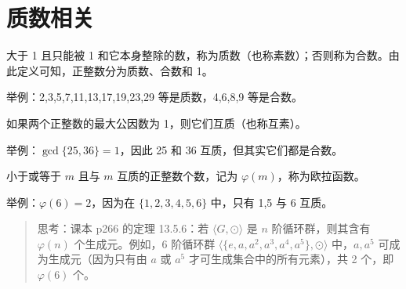 \documentclass[UTF8]{ctexart}
\newcommand\Concept[1]{\colorbox{cyan!10!white}{\textcolor{cyan!40!black}{#1}}}
\newcommand\Notes[1]{\textcolor{yellow!50!black}{\small #1}}
\newcommand\Example[1]{\textcolor{cyan!70!black}{\small #1}}
\newcommand\relation[2]{\langle #1,#2 \rangle}
\newcommand\pos[1]{\hspace{0pt} \marginpar{\footnotesize\ttfamily\textcolor{yellow!50!black}{\hfill #1}}}
\begin{document}
\section{质数相关}
\begin{description}[itemsep=0pt, parsep=0pt]
    \item[\Concept{质数与合数}] \pos{p186} 大于 1 且只能被 1 和它本身整除的数，称为质数（也称\Concept{素数}）；否则称为合数。由此定义可知，正整数分为质数、合数和 1。

    \Example{举例：2,3,5,7,11,13,17,19,23,29 等是质数，4,6,8,9 等是合数。}

    \item[\Concept{互质}] \pos{p188} 如果两个正整数的最大公因数为 1，则它们互质（也称\Concept{互素}）。

    \Example{举例：$\gcd\{25,36\}=1$，因此 25 和 36 互质，但其实它们都是合数。}

    \item[\Concept{欧拉函数$\varphi(m)$}] \pos{p196} 小于或等于 $m$ 且与 $m$ 互质的正整数个数，记为 $\varphi(m)$，称为欧拉函数。

    \Example{举例：$\varphi(6)=2$，因为在 $\{1,2,3,4,5,6\}$ 中，只有 1,5 与 6 互质。}
\end{description}

\newpage
{}
\BgThispage
\begin{quote}
    \Notes{思考：课本 p266 的定理 13.5.6：若 $\relation{G}{\odot}$ 是 $n$ 阶循环群，则其含有 $\varphi(n)$ 个生成元。例如，$6$ 阶循环群 $\relation{\{e,a,a^2,a^3,a^4,a^5\}}{\odot}$ 中，$a,a^5$ 可成为生成元（因为只有由 $a$ 或 $a^5$ 才可生成集合中的所有元素），共 2 个，即 $\varphi(6)$ 个。}
\end{quote}
\end{document}
